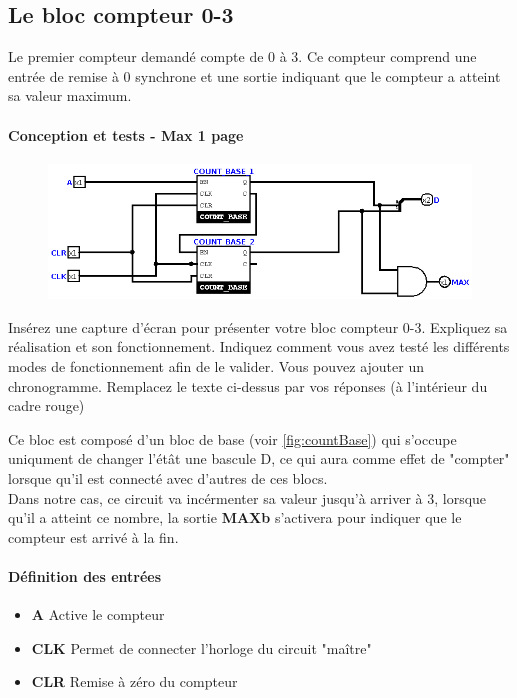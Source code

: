 \documentclass[a4paper]{article} %
\begin{document}
\subsection{Le bloc compteur 0-3}
Le premier compteur demandé compte de 0 à 3. Ce compteur comprend une entrée de remise à 0 synchrone et une sortie indiquant que le compteur a atteint sa valeur maximum.
\begin{tcolorbox}[colframe=Monokaimagenta,colback=white]
\paragraph{Conception et tests - Max 1 page }
\begin{figure}[H]
\centering
    \includegraphics[width=.8\textwidth]{src/COUNT_4BITS.png}
    \label{fig:count4bits}
\end{figure}
Insérez une capture d’écran pour présenter votre bloc compteur 0-3. Expliquez sa réalisation et son fonctionnement.
Indiquez comment vous avez testé les différents modes de fonctionnement afin de le valider. Vous pouvez ajouter un chronogramme.
Remplacez le texte ci-dessus par vos réponses (à l’intérieur du cadre rouge)


Ce bloc est composé d'un bloc de base (voir \ref{fig:countBase}) qui s'occupe uniqument de changer l'étât une bascule D, ce qui aura comme effet de "compter" lorsque qu'il est connecté avec d'autres de ces blocs.\\
Dans notre cas, ce circuit va incérmenter sa valeur jusqu'à arriver à $3$, lorsque qu'il a atteint ce nombre, la sortie \textbf{MAXb} s'activera pour indiquer que le compteur est arrivé à la fin.

\paragraph{Définition des entrées}
\begin{itemize}

    \item     \textbf{A} Active le compteur
    \item     \textbf{CLK} Permet de connecter l'horloge du circuit "maître"
    \item     \textbf{CLR} Remise à zéro du compteur
\end{itemize}


\end{tcolorbox}
\end{document}
